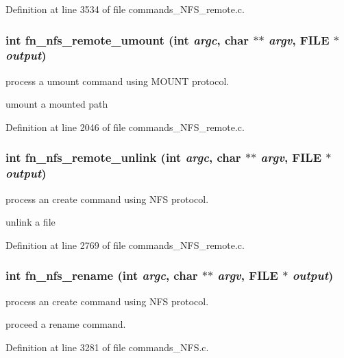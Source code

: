 Definition at line 3534 of file commands\_\-NFS\_\-remote.c.
\subsubsection[{fn\_\-nfs\_\-remote\_\-umount}]{\setlength{\rightskip}{0pt plus 5cm}int fn\_\-nfs\_\-remote\_\-umount (int {\em argc}, \/  char $\ast$$\ast$ {\em argv}, \/  FILE $\ast$ {\em output})}\label{commands_8h_70c8c0f939759e036b0dd786623f942c}


process a umount command using MOUNT protocol.

umount a mounted path 

Definition at line 2046 of file commands\_\-NFS\_\-remote.c.
\subsubsection[{fn\_\-nfs\_\-remote\_\-unlink}]{\setlength{\rightskip}{0pt plus 5cm}int fn\_\-nfs\_\-remote\_\-unlink (int {\em argc}, \/  char $\ast$$\ast$ {\em argv}, \/  FILE $\ast$ {\em output})}\label{commands_8h_e7889c63ec94ea9fabfe222ef77f734f}


process an create command using NFS protocol.

unlink a file 

Definition at line 2769 of file commands\_\-NFS\_\-remote.c.
\subsubsection[{fn\_\-nfs\_\-rename}]{\setlength{\rightskip}{0pt plus 5cm}int fn\_\-nfs\_\-rename (int {\em argc}, \/  char $\ast$$\ast$ {\em argv}, \/  FILE $\ast$ {\em output})}\label{commands_8h_29f386c1c9b5e0de5c8e9c35993e683f}


process an create command using NFS protocol.

proceed a rename command. 

Definition at line 3281 of file commands\_\-NFS.c.
